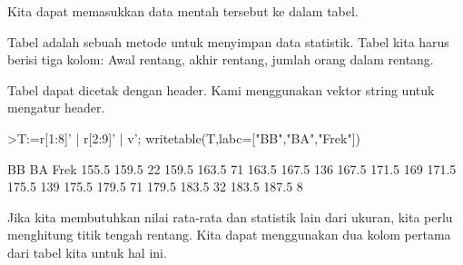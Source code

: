 \documentclass[a4paper,10pt]{article}
\begin{document}
\begin{eulernotebook}
\begin{eulercomment}
\begin{eulercomment}
\begin{eulercomment}
\begin{eulercomment}
\begin{eulercomment}
\begin{eulercomment}
\begin{eulercomment}
\begin{eulercomment}
\begin{eulercomment}
\begin{eulercomment}
\begin{eulercomment}
\begin{eulercomment}
\begin{eulercomment}
\begin{eulercomment}
\begin{eulercomment}
\begin{eulercomment}
\begin{eulercomment}
\begin{eulercomment}
\begin{eulercomment}
\begin{eulercomment}
\begin{eulercomment}
\begin{eulercomment}
\begin{eulercomment}
\begin{eulercomment}
\begin{eulercomment}
\begin{eulercomment}
\begin{eulercomment}
\begin{eulercomment}
\begin{eulercomment}
\begin{eulercomment}
\begin{eulercomment}
\begin{eulercomment}
\begin{eulercomment}
\begin{eulercomment}
\begin{eulercomment}
\begin{eulercomment}
\begin{eulercomment}
\begin{eulercomment}
\begin{eulercomment}
\begin{eulercomment}
\begin{eulercomment}
\begin{eulercomment}
\begin{eulercomment}
\begin{eulercomment}
\begin{eulercomment}
Kita dapat memasukkan data mentah tersebut ke dalam tabel.

Tabel adalah sebuah metode untuk menyimpan data statistik. Tabel kita
harus berisi tiga kolom: Awal rentang, akhir rentang, jumlah orang
dalam rentang.

Tabel dapat dicetak dengan header. Kami menggunakan vektor string
untuk mengatur header.
\end{eulercomment}
\begin{eulerprompt}
>T:=r[1:8]' | r[2:9]' | v'; writetable(T,labc=["BB","BA","Frek"])
\end{eulerprompt}
\begin{euleroutput}
          BB        BA      Frek
       155.5     159.5        22
       159.5     163.5        71
       163.5     167.5       136
       167.5     171.5       169
       171.5     175.5       139
       175.5     179.5        71
       179.5     183.5        32
       183.5     187.5         8
\end{euleroutput}
\begin{eulercomment}
Jika kita membutuhkan nilai rata-rata dan statistik lain dari ukuran,
kita perlu menghitung titik tengah rentang. Kita dapat menggunakan dua
kolom pertama dari tabel kita untuk hal ini.


\end{eulercomment}
\end{eulercomment}
\end{eulercomment}
\end{eulercomment}
\end{eulercomment}
\end{eulercomment}
\end{eulercomment}
\end{eulercomment}
\end{eulercomment}
\end{eulercomment}
\end{eulercomment}
\end{eulercomment}
\end{eulercomment}
\end{eulercomment}
\end{eulercomment}
\end{eulercomment}
\end{eulercomment}
\end{eulercomment}
\end{eulercomment}
\end{eulercomment}
\end{eulercomment}
\end{eulercomment}
\end{eulercomment}
\end{eulercomment}
\end{eulercomment}
\end{eulercomment}
\end{eulercomment}
\end{eulercomment}
\end{eulercomment}
\end{eulercomment}
\end{eulercomment}
\end{eulercomment}
\end{eulercomment}
\end{eulercomment}
\end{eulercomment}
\end{eulercomment}
\end{eulercomment}
\end{eulercomment}
\end{eulercomment}
\end{eulercomment}
\end{eulercomment}
\end{eulercomment}
\end{eulercomment}
\end{eulercomment}
\end{eulercomment}
\end{eulernotebook}
\end{document}
